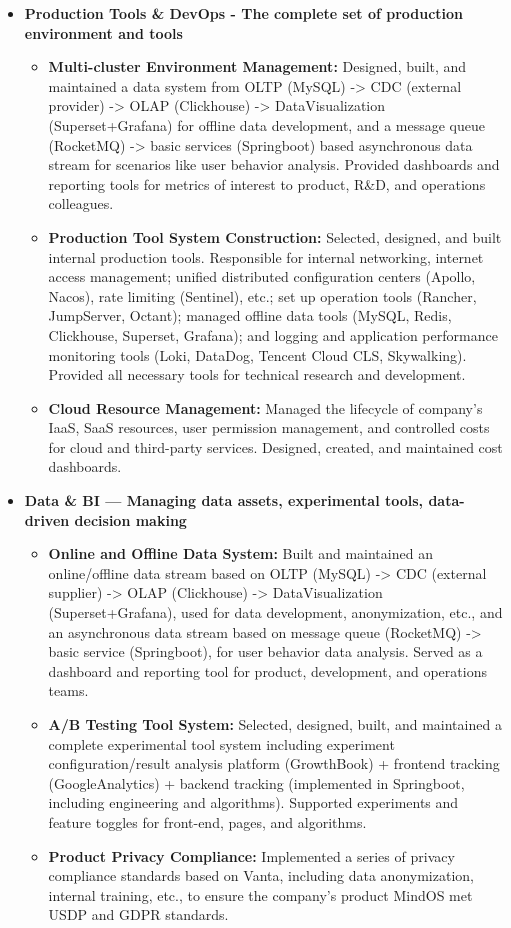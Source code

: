 \documentclass[letterpaper,11pt]{article}
\begin{document}
\begin{spacing}{1.0}
\begin{itemize}
\begin{itemize}
			\item \textbf{Production Tools \& DevOps - The complete set of production environment and tools}
			\begin{itemize}
				\item \textbf{Multi-cluster Environment Management: }Designed, built, and maintained a data system from OLTP (MySQL) -> CDC (external provider) -> OLAP (Clickhouse) -> DataVisualization (Superset+Grafana) for offline data development, and a message queue (RocketMQ) -> basic services (Springboot) based asynchronous data stream for scenarios like user behavior analysis. Provided dashboards and reporting tools for metrics of interest to product, R\&D, and operations colleagues.
				\item \textbf{Production Tool System Construction: }Selected, designed, and built internal production tools. Responsible for internal networking, internet access management; unified distributed configuration centers (Apollo, Nacos), rate limiting (Sentinel), etc.; set up operation tools (Rancher, JumpServer, Octant); managed offline data tools (MySQL, Redis, Clickhouse, Superset, Grafana); and logging and application performance monitoring tools (Loki, DataDog, Tencent Cloud CLS, Skywalking). Provided all necessary tools for technical research and development.
				\item \textbf{Cloud Resource Management: }Managed the lifecycle of company's IaaS, SaaS resources, user permission management, and controlled costs for cloud and third-party services. Designed, created, and maintained cost dashboards.
			\end{itemize}
			
			\item \textbf{Data \& BI — Managing data assets, experimental tools, data-driven decision making}
			\begin{itemize}
				\item \textbf{Online and Offline Data System: }Built and maintained an online/offline data stream based on OLTP (MySQL) -> CDC (external supplier) -> OLAP (Clickhouse) -> DataVisualization (Superset+Grafana), used for data development, anonymization, etc., and an asynchronous data stream based on message queue (RocketMQ) -> basic service (Springboot), for user behavior data analysis. Served as a dashboard and reporting tool for product, development, and operations teams.
				\item \textbf{A/B Testing Tool System: }Selected, designed, built, and maintained a complete experimental tool system including experiment configuration/result analysis platform (GrowthBook) + frontend tracking (GoogleAnalytics) + backend tracking (implemented in Springboot, including engineering and algorithms). Supported experiments and feature toggles for front-end, pages, and algorithms.
				\item \textbf{Product Privacy Compliance: }Implemented a series of privacy compliance standards based on Vanta, including data anonymization, internal training, etc., to ensure the company's product MindOS met USDP and GDPR standards.
			\end{itemize}
			

\end{itemize}
\end{itemize}
\end{spacing}
\end{document}
